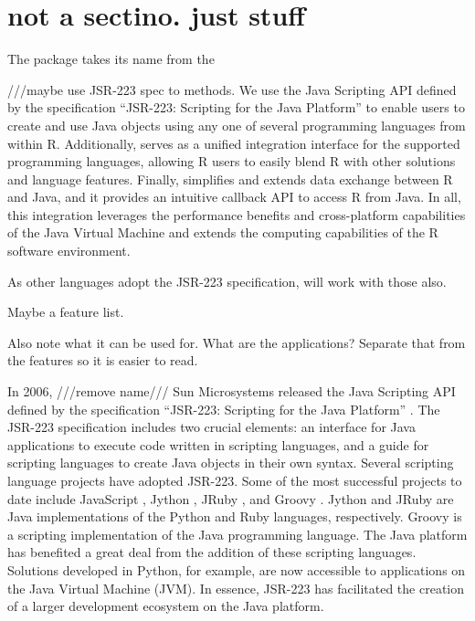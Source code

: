 \section{not a sectino. just stuff}

The  package takes its name from the 

///maybe use JSR-223 spec to methods.
We use the Java Scripting API defined by the specification “JSR-223: Scripting for the Java Platform” \citep{jsr223spec} to enable users to create and use Java objects using any one of several programming languages from within R. Additionally,  serves as a unified integration interface for the supported programming languages, allowing R users to easily blend R with other solutions and language features. Finally,  simplifies and extends data exchange between R and Java, and it provides an intuitive callback API to access R from Java. In all, this integration leverages the performance benefits and cross-platform capabilities of the Java Virtual Machine and extends the computing capabilities of the R software environment.


As other languages adopt the JSR-223 specification,  will work with those also.

Maybe a feature list.

Also note what it can be used for. What are the applications? Separate that from the features so it is easier to read.

In 2006, ///remove name/// Sun Microsystems released the Java Scripting API \citep{jsa} defined by the specification “JSR-223: Scripting for the Java Platform” \citep{jsr223spec}. The JSR-223 specification includes two crucial elements: an interface for Java applications to execute code written in scripting languages, and a guide for scripting languages to create Java objects in their own syntax. Several scripting language projects have adopted JSR-223. Some of the most successful projects to date include JavaScript \citep{jsnashorn}, Jython \citep{jython}, JRuby \citep{jruby}, and Groovy \citep{groovy}. Jython and JRuby are Java implementations of the Python \citep{python} and Ruby \citep{ruby} languages, respectively. Groovy is a scripting implementation of the Java programming language. The Java platform has benefited a great deal from the addition of these scripting languages. Solutions developed in Python, for example, are now accessible to applications on the Java Virtual Machine (JVM). In essence, JSR-223 has facilitated the creation of a larger development ecosystem on the Java platform.

